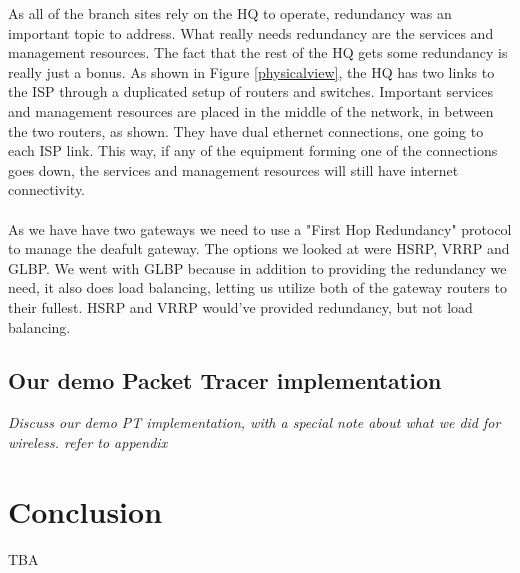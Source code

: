 As all of the branch sites rely on the HQ to operate, redundancy was an important topic to address. What really needs redundancy are the services and management resources. The fact that the rest of the HQ gets some redundancy is really just a bonus. As shown in Figure \ref{physicalview}, the HQ has two links to the ISP through a duplicated setup of routers and switches. Important services and management resources are placed in the middle of the network, in between the two routers, as shown. They have dual ethernet connections, one going to each ISP link. This way, if any of the equipment forming one of the connections goes down, the services and management resources will still have internet connectivity.
\\
\\
As we have have two gateways we need to use a "First Hop Redundancy" protocol to manage the deafult gateway. The options we looked at were HSRP, VRRP and GLBP. We went with GLBP because in addition to providing the redundancy we need, it also does load balancing, letting us utilize both of the gateway routers to their fullest. HSRP and VRRP would've provided redundancy, but not load balancing.




\subsection{Our demo Packet Tracer implementation}

\textit{Discuss our demo PT implementation, with a special note about what we did for wireless. refer to appendix}

\section{Conclusion}
TBA


\clearpage %

\nocite{*}





\clearpage %
\appendix


